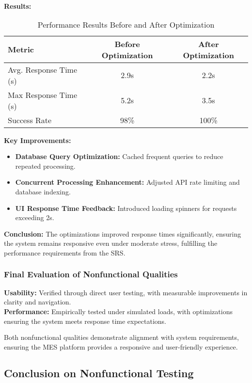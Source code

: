 \documentclass[12pt, titlepage]{article}
\begin{document}
\textbf{Results:}
\begin{table}[h]
\centering
\begin{tabular}{|l|c|c|}
    \hline
    \textbf{Metric} & \textbf{Before Optimization} & \textbf{After Optimization} \\
    \hline
    Avg. Response Time (s) & 2.9s & 2.2s \\
    \hline
    Max Response Time (s) & 5.2s & 3.5s \\
    \hline
    Success Rate & 98\% & 100\% \\
    \hline
\end{tabular}
\caption{Performance Results Before and After Optimization}
\label{tab:performance-results}
\end{table}

\textbf{Key Improvements:}  
\begin{itemize}
    \item \textbf{Database Query Optimization:} Cached frequent queries to reduce repeated processing.
    \item \textbf{Concurrent Processing Enhancement:} Adjusted API rate limiting and database indexing.
    \item \textbf{UI Response Time Feedback:} Introduced loading spinners for requests exceeding 2s.
\end{itemize}

\textbf{Conclusion:}  
The optimizations improved response times significantly, ensuring the system remains responsive even under moderate stress, fulfilling the performance requirements from the SRS.

\subsubsection{Final Evaluation of Nonfunctional Qualities}
\textbf{Usability:} Verified through direct user testing, with measurable improvements in clarity and navigation. \\
\textbf{Performance:} Empirically tested under simulated loads, with optimizations ensuring the system meets response time expectations.

Both nonfunctional qualities demonstrate alignment with system requirements, ensuring the MES platform provides a responsive and user-friendly experience.


\subsection{Conclusion on Nonfunctional Testing}
\end{document}
